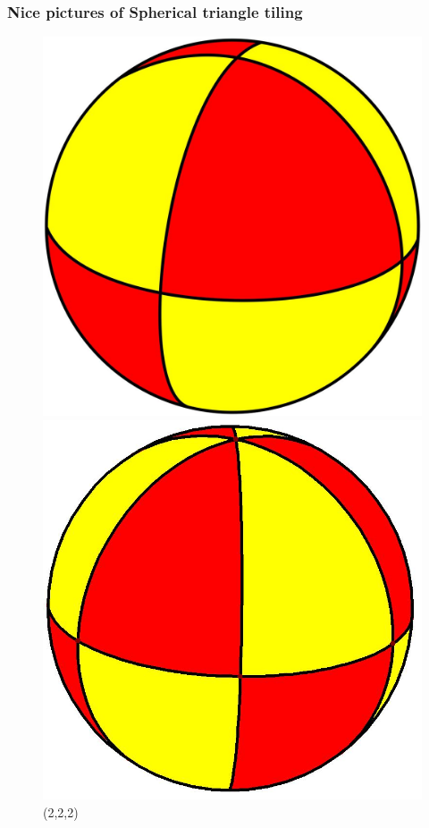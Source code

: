 \documentclass{article}
\begin{document}
\subsubsection{Nice pictures of Spherical triangle tiling}
\begin{figure}[ht]
    \centering
    \begin{minipage}{0.2\linewidth}
        \includegraphics[width=0.9\linewidth]{（2，2，2）.jpg}
        \caption{(2,2,2)}
        \label{fig:subim6}
    \end{minipage}
    \begin{minipage}{0.2\linewidth}
        \includegraphics[width=0.9\linewidth]{（2，2，3）.jpg}

\end{minipage}
\end{figure}
\end{document}
